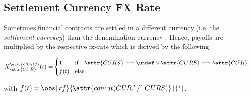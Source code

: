 \subsection{Settlement Currency FX Rate}\label{sec:settlement-cur}

Sometimes financial contracts are settled in a different currency (i.e. the \textit{settlement currency})  than the denomination currency . Hence, payoffs are multiplied by the respective fx-rate which is derived by the following

\[
	X_{\attr{CUR}}^{\attr{CURS}}(t)	= \begin{cases} 1 &\text{if}\quad \attr{CURS} == \undef \vee \attr{CURS} == \attr{CUR} \\
	f(t) &\text{else} \end{cases}
\]

with $f(t)=\obs{rf}{\attr{concat(CUR,'/',CURS)}}{t}$.
